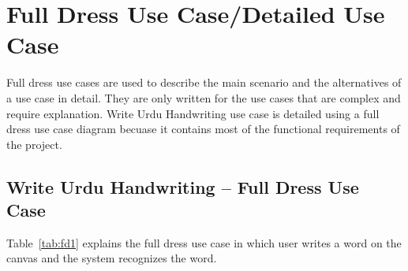 \documentclass[12pt,a4paper]{report}
\begin{document}
\section{Full Dress Use Case/Detailed Use Case}
Full dress use cases are used to describe the main scenario and the alternatives of a use case in detail. They are only written for the use cases that are complex and require explanation. Write Urdu Handwriting use case is detailed using a full dress use case diagram becuase it contains most of the functional requirements of the project.
\subsection{Write Urdu Handwriting -- Full Dress Use Case}
Table~\ref{tab:fd1} explains the full dress use case in which user writes a word on the canvas and the system recognizes the word.
\end{document}
